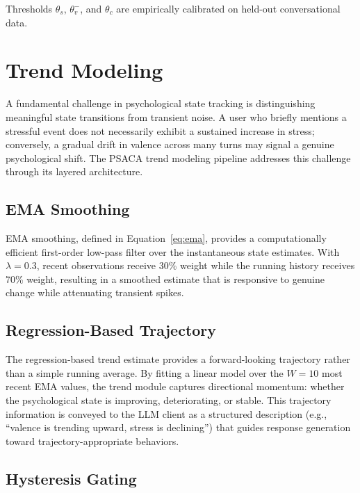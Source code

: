 \documentclass[conference]{IEEEtran}
\begin{document}
Thresholds $\theta_s$, $\theta_v^-$, and $\theta_c$ are empirically calibrated on held-out conversational data.

\section{Trend Modeling}
\label{sec:trends}

A fundamental challenge in psychological state tracking is distinguishing meaningful state transitions from transient noise. A user who briefly mentions a stressful event does not necessarily exhibit a sustained increase in stress; conversely, a gradual drift in valence across many turns may signal a genuine psychological shift. The PSACA trend modeling pipeline addresses this challenge through its layered architecture.

\subsection{EMA Smoothing}

EMA smoothing, defined in Equation~\eqref{eq:ema}, provides a computationally efficient first-order low-pass filter over the instantaneous state estimates. With $\lambda = 0.3$, recent observations receive 30\% weight while the running history receives 70\% weight, resulting in a smoothed estimate that is responsive to genuine change while attenuating transient spikes.

\subsection{Regression-Based Trajectory}

The regression-based trend estimate provides a forward-looking trajectory rather than a simple running average. By fitting a linear model over the $W = 10$ most recent EMA values, the trend module captures directional momentum: whether the psychological state is improving, deteriorating, or stable. This trajectory information is conveyed to the LLM client as a structured description (e.g., ``valence is trending upward, stress is declining'') that guides response generation toward trajectory-appropriate behaviors.

\subsection{Hysteresis Gating}
\end{document}
